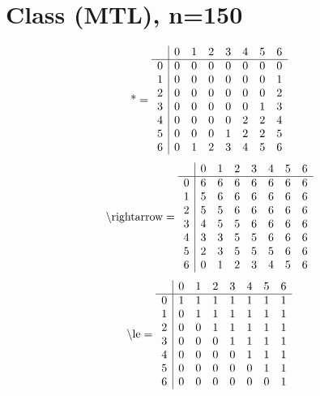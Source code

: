 \documentclass[11pt]{article}
\begin{document}
\section{Class (MTL), n=150}
\[\text{*} = 
\begin{array}{r | r r r r r r r}
 & 0 & 1 & 2 & 3 & 4 & 5 & 6 \\ \hline
0 & 0 & 0 & 0 & 0 & 0 & 0 & 0 \\
1 & 0 & 0 & 0 & 0 & 0 & 0 & 1 \\
2 & 0 & 0 & 0 & 0 & 0 & 0 & 2 \\
3 & 0 & 0 & 0 & 0 & 0 & 1 & 3 \\
4 & 0 & 0 & 0 & 0 & 2 & 2 & 4 \\
5 & 0 & 0 & 0 & 1 & 2 & 2 & 5 \\
6 & 0 & 1 & 2 & 3 & 4 & 5 & 6 \\
\end{array}
\]
\[\text{\textbackslash rightarrow} = 
\begin{array}{r | r r r r r r r}
 & 0 & 1 & 2 & 3 & 4 & 5 & 6 \\ \hline
0 & 6 & 6 & 6 & 6 & 6 & 6 & 6 \\
1 & 5 & 6 & 6 & 6 & 6 & 6 & 6 \\
2 & 5 & 5 & 6 & 6 & 6 & 6 & 6 \\
3 & 4 & 5 & 5 & 6 & 6 & 6 & 6 \\
4 & 3 & 3 & 5 & 5 & 6 & 6 & 6 \\
5 & 2 & 3 & 5 & 5 & 5 & 6 & 6 \\
6 & 0 & 1 & 2 & 3 & 4 & 5 & 6 \\
\end{array}
\]
\[\text{\textbackslash le} = 
\begin{array}{r | r r r r r r r}
 & 0 & 1 & 2 & 3 & 4 & 5 & 6 \\ \hline
0 & 1 & 1 & 1 & 1 & 1 & 1 & 1 \\
1 & 0 & 1 & 1 & 1 & 1 & 1 & 1 \\
2 & 0 & 0 & 1 & 1 & 1 & 1 & 1 \\
3 & 0 & 0 & 0 & 1 & 1 & 1 & 1 \\
4 & 0 & 0 & 0 & 0 & 1 & 1 & 1 \\
5 & 0 & 0 & 0 & 0 & 0 & 1 & 1 \\
6 & 0 & 0 & 0 & 0 & 0 & 0 & 1 \\
\end{array}
\]
\end{document}
